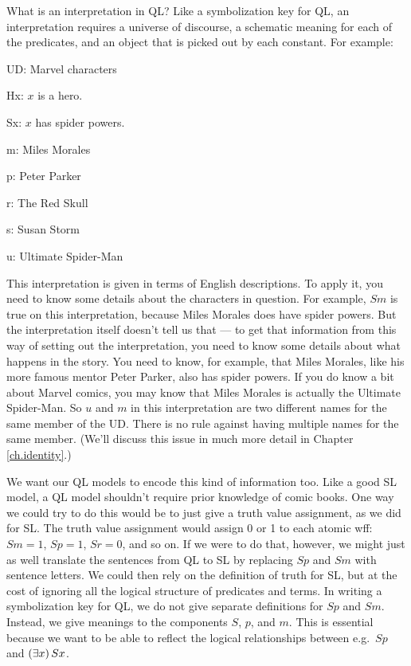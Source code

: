 
What is an interpretation in QL? Like a symbolization key for QL, an interpretation requires a universe of discourse, a schematic meaning for each of the predicates, and an object that is picked out by each constant. For example:

\begin{ekey}
\item[UD:] Marvel characters
\item[Hx:] $x$ is a hero.
\item[Sx:] $x$ has spider powers.
\item[m:] Miles Morales
\item[p:] Peter Parker
\item[r:] The Red Skull
\item[s:] Susan Storm
\item[u:] Ultimate Spider-Man
\end{ekey}

This interpretation is given in terms of English descriptions. To apply it, you need to know some details about the characters in question. For example, $Sm$ is true on this interpretation, because Miles Morales does have spider powers. But the interpretation itself doesn't tell us that --- to get that information from this way of setting out the interpretation, you need to know some details about what happens in the story. You need to know, for example, that Miles Morales, like his more famous mentor Peter Parker, also has spider powers. If you do know a bit about Marvel comics, you may know that Miles Morales is actually the Ultimate Spider-Man. So $u$ and $m$ in this interpretation are two different names for the same member of the UD. There is no rule against having multiple names for the same member. (We'll discuss this issue in much more detail in Chapter \ref{ch.identity}.)

We want our QL models to encode this kind of information too. Like a good SL model, a QL model shouldn't require prior knowledge of comic books. One way we could try to do this would be to just give a truth value assignment, as we did for SL. The truth value assignment would assign 0 or 1 to each atomic wff: $Sm=1$, $Sp=1$, $Sr=0$, and so on. If we were to do that, however, we might just as well translate the sentences from QL to SL by replacing $Sp$ and $Sm$ with sentence letters. We could then rely on the definition of truth for SL, but at the cost of ignoring all the logical structure of predicates and terms. In writing a symbolization key for QL, we do not give separate definitions for $Sp$ and $Sm$. Instead, we give meanings to the components $S$, $p$, and $m$. This is essential because we want to be able to reflect the logical relationships between e.g.\ $Sp$ and $(\exists x) \, Sx$.

